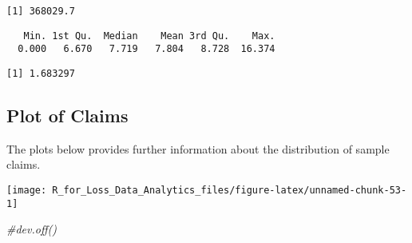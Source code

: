 \documentclass[]{book}
\newenvironment{Shaded}{\begin{snugshade}}{\end{snugshade}}
\newcommand{\KeywordTok}[1]{\textcolor[rgb]{0.13,0.29,0.53}{\textbf{#1}}}
\newcommand{\DataTypeTok}[1]{\textcolor[rgb]{0.13,0.29,0.53}{#1}}
\newcommand{\DecValTok}[1]{\textcolor[rgb]{0.00,0.00,0.81}{#1}}
\newcommand{\StringTok}[1]{\textcolor[rgb]{0.31,0.60,0.02}{#1}}
\newcommand{\CommentTok}[1]{\textcolor[rgb]{0.56,0.35,0.01}{\textit{#1}}}
\newcommand{\OperatorTok}[1]{\textcolor[rgb]{0.81,0.36,0.00}{\textbf{#1}}}
\newcommand{\NormalTok}[1]{#1}
\theoremstyle{definition}
\theoremstyle{definition}
\theoremstyle{definition}
\theoremstyle{remark}
\begin{document}
\begin{verbatim}
[1] 368029.7
\end{verbatim}

\begin{Shaded}
\end{Shaded}

\begin{verbatim}
   Min. 1st Qu.  Median    Mean 3rd Qu.    Max. 
  0.000   6.670   7.719   7.804   8.728  16.374 
\end{verbatim}

\begin{verbatim}
[1] 1.683297
\end{verbatim}

\subsection{Plot of Claims}\label{plot-of-claims}

The plots below provides further information about the distribution of
sample claims.

\begin{Shaded}
\end{Shaded}

\begin{center}\texttt{[image: R\_for\_Loss\_Data\_Analytics\_files/figure-latex/unnamed-chunk-53-1]} \end{center}

\begin{Shaded}
\begin{Highlighting}[]
\CommentTok{#dev.off()}
\end{Highlighting}
\end{Shaded}
\end{document}
